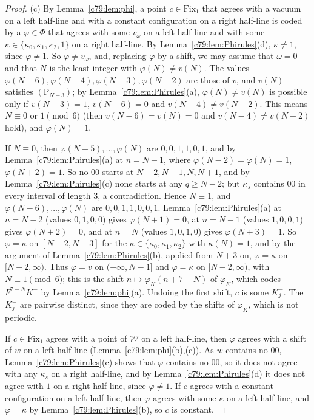 \begin{proof}
(c) By Lemma~\ref{c79:lem:phi}, a point $c\in\mathrm{Fix}_1$ that agrees with a vacuum on a left half-line and with a constant configuration on a right half-line is coded by a $\varphi\in\Phi$ that agrees with some $v_\omega$ on a left half-line and with some $\kappa\in\{\kappa_0,\kappa_1,\kappa_2,1\}$ on a right half-line. By Lemma~\ref{c79:lem:Phirules}(d), $\kappa\ne1$, since $\varphi\ne1$. So $\varphi\ne v_\omega$, and, replacing $\varphi$ by a shift, we may assume that $\omega=0$ and that $N$ is the least integer with $\varphi(N)\ne v(N)$. The values $\varphi(N-6),\varphi(N-4),\varphi(N-3),\varphi(N-2)$ are those of $v$, and $v(N)$ satisfies $(\mathrm P_{N-3})$; by Lemma~\ref{c79:lem:Phirules}(a), $\varphi(N)\ne v(N)$ is possible only if $v(N-3)=1$, $v(N-6)=0$ and $v(N-4)\ne v(N-2)$. This means $N\equiv0$ or $1\pmod 6$ (then $v(N-6)=v(N)=0$ and $v(N-4)\ne v(N-2)$ hold), and $\varphi(N)=1$.

If $N\equiv0$, then $\varphi(N-5),\dots,\varphi(N)$ are $0,0,1,1,0,1$, and by Lemma~\ref{c79:lem:Phirules}(a) at $n=N-1$, where $\varphi(N-2)=\varphi(N)=1$, $\varphi(N+2)=1$. So no $00$ starts at $N-2,N-1,N,N+1$, and by Lemma~\ref{c79:lem:Phirules}(c) none starts at any $q\ge N-2$; but $\kappa_s$ contains $00$ in every interval of length $3$, a contradiction. Hence $N\equiv1$, and $\varphi(N-6),\dots,\varphi(N)$ are $0,0,1,1,0,0,1$. Lemma~\ref{c79:lem:Phirules}(a) at $n=N-2$ (values $0,1,0,0$) gives $\varphi(N+1)=0$, at $n=N-1$ (values $1,0,0,1$) gives $\varphi(N+2)=0$, and at $n=N$ (values $1,0,1,0$) gives $\varphi(N+3)=1$. So $\varphi=\kappa$ on $[N-2,N+3]$ for the $\kappa\in\{\kappa_0,\kappa_1,\kappa_2\}$ with $\kappa(N)=1$, and by the argument of Lemma~\ref{c79:lem:Phirules}(b), applied from $N+3$ on, $\varphi=\kappa$ on $[N-2,\infty)$. Thus $\varphi=v$ on $(-\infty,N-1]$ and $\varphi=\kappa$ on $[N-2,\infty)$, with $N\equiv1\pmod6$; this is the shift $n\mapsto\varphi_K(n+7-N)$ of $\varphi_K$, which codes $F^{7-N}K^-$ by Lemma~\ref{c79:lem:phi}(a). Undoing the first shift, $c$ is some $K^-_j$. The $K^-_j$ are pairwise distinct, since they are coded by the shifts of $\varphi_K$, which is not periodic.

If $c\in\mathrm{Fix}_1$ agrees with a point of $\mathcal W$ on a left half-line, then $\varphi$ agrees with a shift of $w$ on a left half-line (Lemma~\ref{c79:lem:phi}(b),(c)). As $w$ contains no $00$, Lemma~\ref{c79:lem:Phirules}(c) shows that $\varphi$ contains no $00$, so it does not agree with any $\kappa_s$ on a right half-line, and by Lemma~\ref{c79:lem:Phirules}(d) it does not agree with $1$ on a right half-line, since $\varphi\ne1$. If $c$ agrees with a constant configuration on a left half-line, then $\varphi$ agrees with some $\kappa$ on a left half-line, and $\varphi=\kappa$ by Lemma~\ref{c79:lem:Phirules}(b), so $c$ is constant.


\end{proof}
